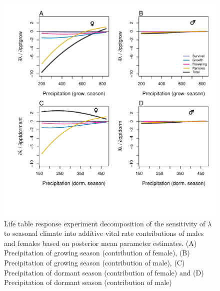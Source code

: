 \documentclass[12pt]{article}
\begin{document}
\begin{figure}[H]
  \begin{center}
    \includegraphics[width=0.95\linewidth]{Figures/LTRE_Precipitation.pdf}
  \caption{Life table response experiment decomposition of the sensitivity of $\lambda$ to seasonal climate into additive vital rate contributions of males and females based on posterior mean parameter estimates.
 (A) Precipitation of growing season (contribution of female), (B) Precipitation of growing season (contribution of male),  (C) Precipitation of dormant season (contribution of female) and (D) Precipitation of dormant season (contribution of male)}
  \label{Sup:LTREppt}
  \end{center}
\end{figure}
\end{document}

